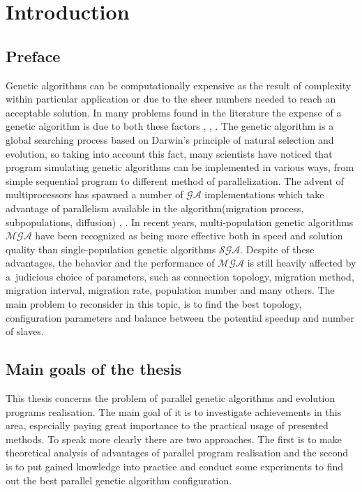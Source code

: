 \section{Introduction}

\subsection{Preface}
\label{cha:Goals}
Genetic algorithms can be computationally expensive as the result of
complexity within particular application or due to the sheer numbers needed to
reach an acceptable solution. In many problems found in the literature the
expense of a genetic algorithm is due to both these factors \cite{bib5},
\cite{bib7}, \cite{bib11}. The genetic algorithm is a global searching process
based on Darwin's principle of natural selection and evolution, so taking into
account this fact, many scientists have noticed that program simulating genetic
algorithms can be implemented in various ways, from
simple sequential program to different method of parallelization. The advent of
multiprocessors has spawned a number of $\mathcal{GA}$ implementations which take advantage
of parallelism available in the algorithm(migration process, subpopulations,
diffusion) \cite{bib8}, \cite{bib9}. In recent years, multi-population genetic algorithms $\mathcal{MGA}$ 
have been recognized as being more effective both in speed and solution quality 
than single-population genetic algorithms $\mathcal{SGA}$. Despite of these advantages,
the behavior and the performance of $\mathcal{MGA}$ is still heavily 
affected by a~judicious choice of parameters, such as connection topology, 
migration method, migration interval, migration rate, population number and many
others. The main problem to reconsider in this topic, is to find the best topology, configuration
parameters and balance between the potential speedup and number of slaves.

\subsection{Main goals of the thesis}
This thesis concerns the problem of parallel genetic algorithms and evolution
programs realisation. The main goal of it is to investigate achievements in this area,
especially paying great importance to the practical usage of presented methods. To
speak more clearly there are two approaches. The first is to make theoretical
analysis of advantages of parallel program realisation and the second is to put
gained knowledge into practice and conduct some experiments to find out the best
parallel genetic algorithm configuration.


